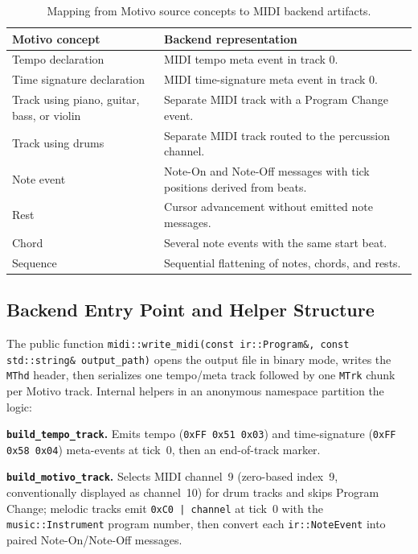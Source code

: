 \begin{table}[htbp]
  \centering
  \renewcommand{\arraystretch}{1.3}
  \begin{tabularx}{\textwidth}{>{\raggedright\arraybackslash}p{3.4cm}X}
    \toprule
    \textbf{Motivo concept} & \textbf{Backend representation} \\
    \midrule
    Tempo declaration & MIDI tempo meta event in track 0. \\
    Time signature declaration & MIDI time-signature meta event in track 0. \\
    Track using piano, guitar, bass, or violin & Separate MIDI track with a Program Change event. \\
    Track using drums & Separate MIDI track routed to the percussion channel. \\
    Note event & Note-On and Note-Off messages with tick positions derived from beats. \\
    Rest & Cursor advancement without emitted note messages. \\
    Chord & Several note events with the same start beat. \\
    Sequence & Sequential flattening of notes, chords, and rests. \\
    \bottomrule
  \end{tabularx}
  \caption{Mapping from Motivo source concepts to MIDI backend artifacts.}\label{tab:motivo-midi-mapping}
\end{table}

\subsection{Backend Entry Point and Helper Structure}\label{detail-subsec:midi-write-entry}

The public function \texttt{midi::write\_midi(const ir::Program\&, const std::string\& output\_path)} opens the output
file in binary mode, writes the \texttt{MThd} header, then serializes one tempo/meta track followed by one \texttt{MTrk}
chunk per Motivo track.
Internal helpers in an anonymous namespace partition the logic:

\noindent \textbf{\texttt{build\_tempo\_track}.} Emits tempo (\texttt{0xFF 0x51 0x03}) and time-signature
(\texttt{0xFF 0x58 0x04}) meta-events at tick~0, then an end-of-track marker.

\noindent \textbf{\texttt{build\_motivo\_track}.} Selects MIDI channel~9 (zero-based index~9, conventionally displayed
as channel~10) for drum tracks and skips Program Change; melodic tracks emit \texttt{0xC0 | channel} at tick~0 with the
\texttt{music::Instrument} program number, then convert each \texttt{ir::NoteEvent} into paired Note-On/Note-Off
messages.

